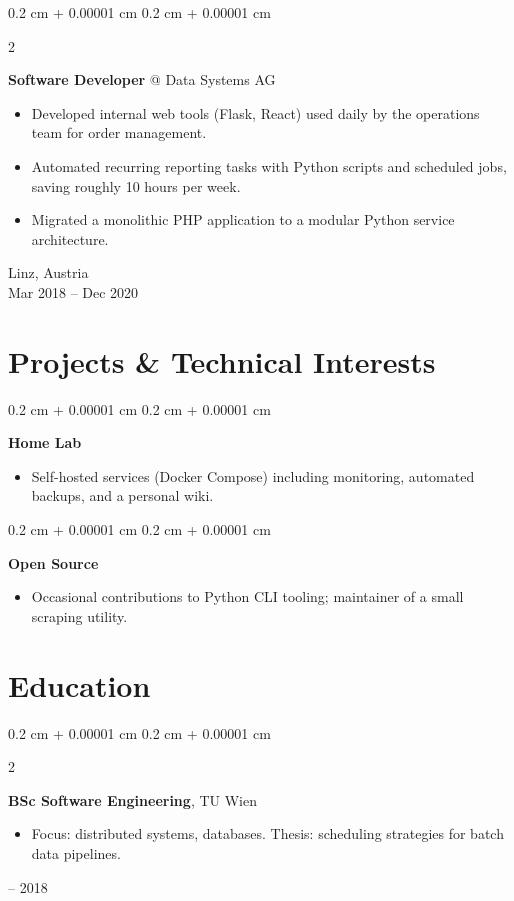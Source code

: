 \documentclass[10pt, letterpaper]{article}
\newenvironment{highlights}{
    \begin{itemize}[
        topsep=0.10 cm,
        parsep=0.10 cm,
        partopsep=0pt,
        itemsep=0pt,
        leftmargin=0.4 cm + 10pt
    ]
}{
    \end{itemize}
}
\newenvironment{onecolentry}{
    \begin{adjustwidth}{
        0.2 cm + 0.00001 cm
    }{
        0.2 cm + 0.00001 cm
    }
}{
    \end{adjustwidth}
}
\newenvironment{twocolentry}[2][]{
    \onecolentry
    \def\secondColumn{#2}
    \setcolumnwidth{\fill, 4.5 cm}
    \begin{paracol}{2}
}{
    \switchcolumn \raggedleft \secondColumn
    \end{paracol}
    \endonecolentry
}
\begin{document}
        \vspace{0.2 cm}

        \begin{twocolentry}{
            Linz, Austria \\
            Mar 2018 -- Dec 2020
        }
            \textbf{Software Developer} @ Data Systems AG
            \begin{highlights}
                \item Developed internal web tools (Flask, React) used daily by the operations team for order management.
                \item Automated recurring reporting tasks with Python scripts and scheduled jobs, saving roughly 10 hours per week.
                \item Migrated a monolithic PHP application to a modular Python service architecture.
            \end{highlights}
        \end{twocolentry}

    \section{Projects \& Technical Interests}

        \begin{onecolentry}
            \textbf{Home Lab}
            \begin{highlights}
                \item Self-hosted services (Docker Compose) including monitoring, automated backups, and a personal wiki.
            \end{highlights}
        \end{onecolentry}

        \begin{onecolentry}
            \textbf{Open Source}
            \begin{highlights}
                \item Occasional contributions to Python CLI tooling; maintainer of a small scraping utility.
            \end{highlights}
        \end{onecolentry}

    \section{Education}

        \begin{twocolentry}{
            2014 -- 2018
        }
            \textbf{BSc Software Engineering}, TU Wien
            \begin{highlights}
                \item Focus: distributed systems, databases. Thesis: scheduling strategies for batch data pipelines.
            \end{highlights}
        \end{twocolentry}
\end{document}
